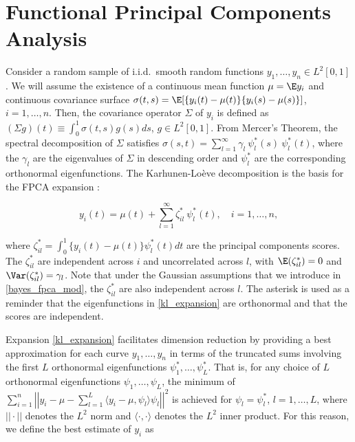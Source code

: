 \documentclass[ba]{imsart}
\numberwithin{equation}{section}
\theoremstyle{plain}
\begin{document}

\section{Functional Principal Components Analysis}
\label{sec:fpca}

Consider a random sample of i.i.d.\ smooth random functions $y_1, \dots, y_n \in L^2 [0, 1]$. We will assume the
existence of a continuous mean function $\mu = \E y_i$ and continuous covariance surface
$\sigma (t, s) = \E [ \{ y_i (t) - \mu (t) \} \{ y_i (s) - \mu (s) \} ]$, $i = 1, \dots, n$.
Then, the covariance operator $\Sigma$ of $y_i$ is defined as $(\Sigma g) (t) \equiv \int_0^1 \sigma (t, s) g(s) ds$, 
$g \in L^2 [0, 1]$. From Mercer's Theorem, the spectral decomposition of $\Sigma$ satisfies $\sigma (s, t) =
\sum_{l=1}^\infty \gamma_l \ \psi^*_l (s) \ \psi^*_l (t)$, where the $\gamma_l$ are the eigenvalues of
$\Sigma$ in descending
order and $\psi^*_l$ are the corresponding orthonormal eigenfunctions. The Karhunen-Lo\`{e}ve decomposition
is the basis for the FPCA expansion \citep{yao05}:

\begin{equation}
	y_i (t) = \mu (t) + \sum_{l=1}^\infty \zeta^*_{il} \ \psi^*_l (t), \quad i = 1, \dots, n,
\label{kl_expansion}
\end{equation}

\noindent where $\zeta^*_{il} = \int_0^1 \{ y_i (t) - \mu(t) \} \psi^*_l(t) dt$ are the principal components
scores. The $\zeta^*_{il}$ are independent across $i$ and uncorrelated across $l$, with $\E (\zeta^*_{il}) = 0$
and $\Var (\zeta^*_{il}) = \gamma_l$. Note that under the Gaussian assumptions that we introduce  in
\eqref{bayes_fpca_mod}, the $\zeta^*_{il}$ are also independent across $l$.
The asterisk is used as a reminder that the eigenfunctions in
\eqref{kl_expansion} are orthonormal and that the scores are independent.

Expansion \eqref{kl_expansion} facilitates dimension reduction by providing a best approximation for each
curve $y_1, \dots, y_n$ in terms of the truncated sums involving the first $L$ orthonormal eigenfunctions
$\psi^*_1, \dots, \psi^*_L$. That is, for any choice of $L$ orthonormal eigenfunctions $\psi_1, \dots, \psi_L$, the
minimum of $\sum_{i=1}^n \left|\left| y_i - \mu - \sum_{l=1}^L \langle y_i - \mu , \psi_l \rangle \psi_l \right|\right|^2$
is achieved for $\psi_l = \psi^*_l$, $l = 1, \dots, L$, where $|| \cdot ||$ denotes the $L^2$ norm and
$\langle \cdot, \cdot \rangle$ denotes the $L^2$ inner product. For this reason, we define the best estimate of
$y_i$ as
\end{document}
